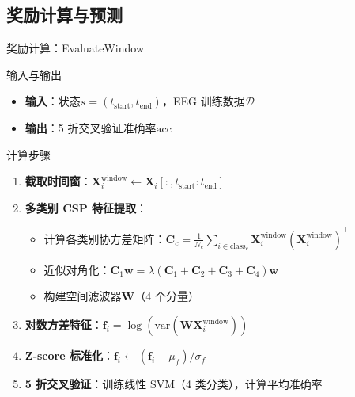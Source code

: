 {%
\subsection{奖励计算与预测}

\begin{frame}{奖励计算：EvaluateWindow}
    \begin{block}{输入与输出}
        \footnotesize
        \begin{itemize}
            \item \textbf{输入}：状态$s = (t_{\text{start}}, t_{\text{end}})$，EEG 训练数据$\mathcal{D}$
            \item \textbf{输出}：5 折交叉验证准确率$\text{acc}$
        \end{itemize}
    \end{block}

    \vspace{0.2cm}
    \begin{alertblock}{计算步骤\cite{blankertz2008optimizing}}
        \footnotesize
        \begin{enumerate}
            \item \textbf{截取时间窗}：$\mathbf{X}_i^{\text{window}} \leftarrow \mathbf{X}_i[:, t_{\text{start}}:t_{\text{end}}]$
            \item \textbf{多类别 CSP 特征提取}：
            \begin{itemize}
                \item 计算各类别协方差矩阵：$\mathbf{C}_c = \frac{1}{N_c}\sum_{i \in \text{class}_c} \mathbf{X}_i^{\text{window}} (\mathbf{X}_i^{\text{window}})^\top$
                \item 近似对角化：$\mathbf{C}_1 \mathbf{w} = \lambda (\mathbf{C}_1 + \mathbf{C}_2 + \mathbf{C}_3 + \mathbf{C}_4) \mathbf{w}$
                \item 构建空间滤波器$\mathbf{W}$（4 个分量）
            \end{itemize}
            \item \textbf{对数方差特征}：$\mathbf{f}_i = \log(\text{var}(\mathbf{W} \mathbf{X}_i^{\text{window}}))$
            \item \textbf{Z-score 标准化}：$\mathbf{f}_i \leftarrow (\mathbf{f}_i - \mu_f) / \sigma_f$
            \item \textbf{5 折交叉验证}：训练线性 SVM（4 类分类），计算平均准确率
        \end{enumerate}
    \end{alertblock}
\end{frame}

}

